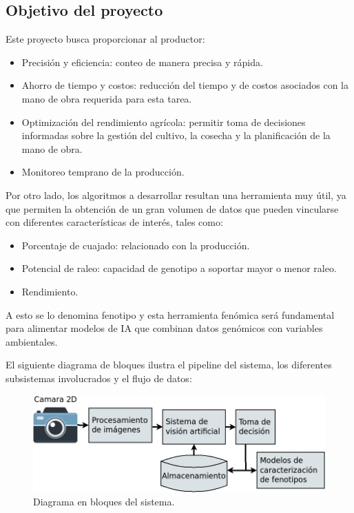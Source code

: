 \documentclass[
11pt %
]{charter}
\begin{document}
\subsection{Objetivo del proyecto}

Este proyecto busca proporcionar al productor:
\begin{itemize}
	\item Precisión y eficiencia: conteo de manera precisa y rápida.
	\item Ahorro de tiempo y costos: reducción del tiempo y de costos asociados con la mano de obra requerida para esta tarea.
	\item Optimización del rendimiento agrícola: permitir toma de decisiones informadas sobre la gestión del cultivo, la cosecha y la planificación de la mano de obra.
	\item Monitoreo temprano de la producción.
\end{itemize}

Por otro lado, los algoritmos a desarrollar resultan una herramienta muy útil, ya que permiten la obtención de un gran volumen de datos que pueden vincularse con diferentes características de interés, tales como:

\begin{itemize}
	\item Porcentaje de cuajado: relacionado con la producción.
	\item Potencial de raleo: capacidad de genotipo a soportar mayor o menor raleo.
	\item Rendimiento.
\end{itemize}

A esto se lo denomina fenotipo y esta herramienta fenómica será fundamental para
alimentar modelos de IA que combinan datos genómicos con variables ambientales.

El siguiente diagrama de bloques ilustra el pipeline del sistema, los diferentes subsistemas involucrados y el flujo de datos:

\begin{figure}[htpb]
\centering 
\includegraphics[width=.85\textwidth]{./Figuras/diagrama.png}
\caption{Diagrama en bloques del sistema.}
\label{fig:diagBloques}
\end{figure}
\end{document}
